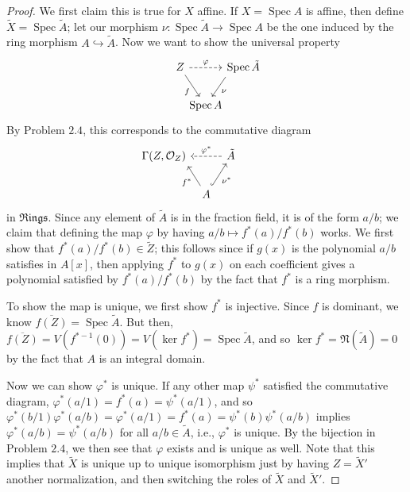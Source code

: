 \documentclass[12pt,letterpaper]{article}
\theoremstyle{definition}
\theoremstyle{remark}
\numberwithin{equation}{section}
\numberwithin{figure}{problem}
\DeclareMathOperator{\Spec}{Spec}
\newcommand{\OO}{\mathcal{O}}
\newcommand{\Rings}{\mathfrak{Rings}}
\begin{document}
\begin{proof}
  We first claim this is true for $X$ affine. If $X = \Spec A$ is affine, then define $\tilde{X} = \Spec \tilde{A}$; let our morphism $\nu\colon\Spec \tilde{A} \to \Spec A$ be the one induced by the ring morphism $A \hookrightarrow \tilde{A}$. Now we want to show the universal property
  \begin{equation*}
    \begin{tikzcd}[column sep=tiny]
      Z \arrow[dashed]{rr}{\varphi}\arrow{dr}[swap]{f} & & \makebox[\widthof{$\tilde{X}$}][l]{$\Spec \tilde{A}$}\arrow{dl}{\nu}\\
      & \makebox[\widthof{$X$}][c]{$\Spec A$}
    \end{tikzcd}
  \end{equation*}
  By Problem $2.4$, this corresponds to the commutative diagram
  \begin{equation*}
    \begin{tikzcd}[column sep=tiny]
      \makebox[\widthof{$Z$}][r]{$\Gamma(Z,\OO_Z)$} & & \arrow[dashed]{ll}[swap]{\varphi^*} \tilde{A}\\
      & A \arrow{ul}{f^*} \arrow[hookrightarrow]{ur}[swap]{\nu^*}
    \end{tikzcd}
  \end{equation*}
  in $\Rings$. Since any element of $\tilde{A}$ is in the fraction field, it is of the form $a/b$; we claim that defining the map $\varphi$ by having $a/b \mapsto f^*(a)/f^*(b)$ works. We first show that $f^*(a)/f^*(b) \in \tilde{Z}$; this follows since if $g(x)$ is the polynomial $a/b$ satisfies in $A[x]$, then applying $f^*$ to $g(x)$ on each coefficient gives a polynomial satisfied by $f^*(a)/f^*(b)$ by the fact that $f^*$ is a ring morphism.
  \par To show the map is unique, we first show $f^*$ is injective. Since $f$ is dominant, we know $\overline{f(Z)} = \Spec \tilde{A}$. But then, $\overline{f(Z)} = V(f^{*-1}(0)) = V(\ker f^*) = \Spec\tilde{A}$, and so $\ker f^* = \mathfrak{N}(\tilde{A}) = 0$ by the fact that $A$ is an integral domain.
  \par Now we can show $\varphi^*$ is unique. If any other map $\psi^*$ satisfied the commutative diagram, $\varphi^*(a/1) = f^*(a) = \psi^*(a/1)$, and so $\varphi^*(b/1)\varphi^*(a/b) = \varphi^*(a/1) = f^*(a) = \psi^*(b)\psi^*(a/b)$ implies $\varphi^*(a/b) = \psi^*(a/b)$ for all $a/b \in \tilde{A}$, i.e., $\varphi^*$ is unique. By the bijection in Problem $2.4$, we then see that $\varphi$ exists and is unique as well. Note that this implies that $\tilde{X}$ is unique up to unique isomorphism just by having $Z = \tilde{X}'$ another normalization, and then switching the roles of $\tilde{X}$ and $\tilde{X}'$.

\end{proof}
\end{document}
